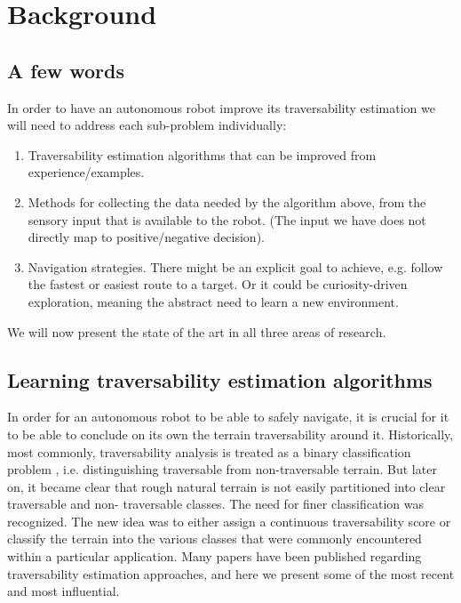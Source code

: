 \documentclass[12pt,a4paper]{report}
\begin{document}
	\chapter{Background}
	\label{sec:bg}
	
	\section{A few words}
	\label{sec:bg:intro}
	
	In order to have an autonomous robot improve its traversability 
	estimation we will need to address each sub-problem individually:
	
	\begin{enumerate}
		\item Traversability estimation algorithms that can be improved from 
		experience/examples.
		\item Methods for collecting the data needed by the algorithm above, from 
		the sensory input that is available to the robot. (The input we have does not 
		directly map to positive/negative decision).
		\item Navigation strategies. There might be an explicit goal to achieve, e.g.
		follow the fastest or easiest route to a target. Or it could be curiosity-driven 
		exploration, meaning the abstract need to learn a new environment.
	\end{enumerate}
	
	We will now present the state of the art in all three areas of research.
	\\
	
	\section{Learning traversability estimation algorithms}
	\label{sec:bg:trav}
	
	In order for an autonomous robot to be able to safely navigate, it is crucial 
	for it to be able to conclude on its own the terrain traversability 
	around it. Historically, most commonly, traversability analysis is 
	treated as a binary classification problem \citep{Papadakis}, i.e. distinguishing 
	traversable from non-traversable terrain. But later on, it became clear that 
	rough natural terrain is not easily partitioned into clear traversable and non-
	traversable classes. The need for finer classification was recognized. The new 
	idea was to either assign a continuous traversability score or classify 
	the terrain into the various classes that were commonly encountered within a 
	particular application. Many papers have been published regarding 
	traversability estimation approaches, and here we present some of the 
	most recent and most influential.
	\\
	
\end{document}
